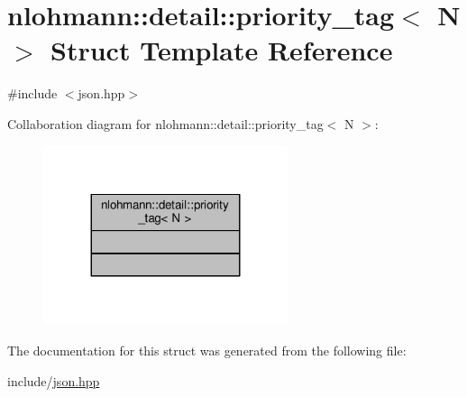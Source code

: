 \hypertarget{structnlohmann_1_1detail_1_1priority__tag}{}\section{nlohmann\+:\+:detail\+:\+:priority\+\_\+tag$<$ N $>$ Struct Template Reference}
\label{structnlohmann_1_1detail_1_1priority__tag}


{\ttfamily \#include $<$json.\+hpp$>$}



Collaboration diagram for nlohmann\+:\+:detail\+:\+:priority\+\_\+tag$<$ N $>$\+:
\nopagebreak
\begin{figure}[H]
\begin{center}
\leavevmode
\includegraphics[width=203pt]{structnlohmann_1_1detail_1_1priority__tag__coll__graph}
\end{center}
\end{figure}


The documentation for this struct was generated from the following file\+:\begin{DoxyCompactItemize}
\item 
include/\hyperlink{json_8hpp}{json.\+hpp}\end{DoxyCompactItemize}

